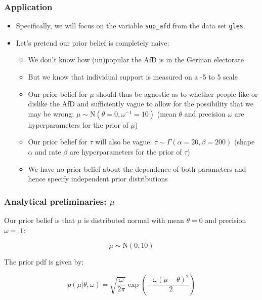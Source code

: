 \documentclass[
  11pt,
]{article}
\providecommand{\tightlist}{%
  \setlength{\itemsep}{0pt}\setlength{\parskip}{0pt}}
\begin{document}
\hypertarget{application}{%
\subsubsection{Application}\label{application}}

\begin{itemize}
\tightlist
\item
  Specifically, we will focus on the variable \texttt{sup\_afd} from the data set \texttt{gles}.
\item
  Let's pretend our prior belief is completely naive:

  \begin{itemize}
  \tightlist
  \item
    We don't know how (un)popular the AfD is in the German electorate
  \item
    But we know that individual support is measured on a -5 to 5 scale
  \item
    Our prior belief for \(\mu\) should thus be agnostic as to whether people like or dislike the AfD and sufficiently vague to allow for the possibility that we may be wrong: \(\mu \sim \text{N}(\theta = 0, \omega^{-1} = 10)\) (mean \(\theta\) and precision \(\omega\) are hyperparameters for the prior of \(\mu\))
  \item
    Our prior belief for \(\tau\) will also be vague: \(\tau \sim \Gamma(\alpha = 20, \beta = 200)\) (shape \(\alpha\) and rate \(\beta\) are hyperparameters for the prior of \(\tau\))
  \item
    We have no prior belief about the dependence of both parameters and hence specify independent prior distributions
  \end{itemize}
\end{itemize}

\hypertarget{analytical-preliminaries-mu}{%
\subsubsection{\texorpdfstring{Analytical preliminaries: \(\mu\)}{Analytical preliminaries: \textbackslash mu}}\label{analytical-preliminaries-mu}}

Our prior belief is that \(\mu\) is distributed normal with mean \(\theta = 0\) and precision \(\omega = .1\):

\[\mu \sim \text{N}(0, 10)\]

The prior pdf is given by:

\[
p(\mu | \theta, \omega) = \sqrt{\frac{\omega}{2 \pi}} \exp \left (-\frac{\omega (\mu - \theta)^2}{2} \right)
\]
\end{document}
